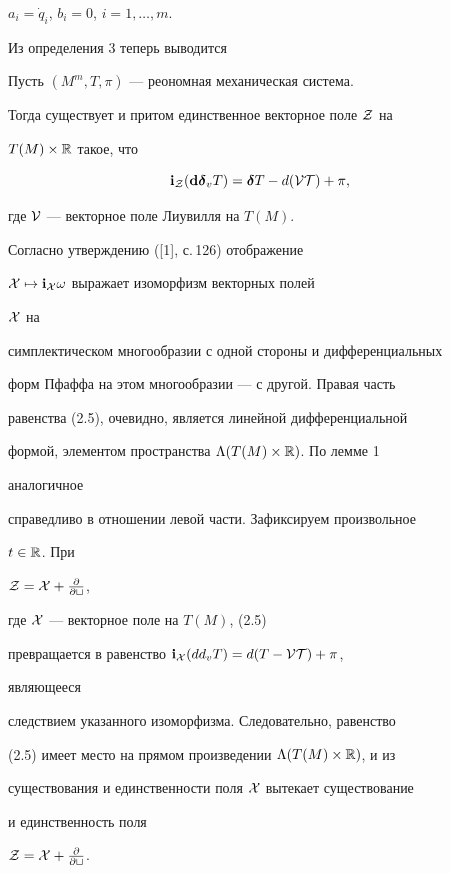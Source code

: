 $a_i=\Dot q_i$, $b_i=0$, $i=1,\dotsc,m$. 


 


Из определения 3 теперь выводится


 


\begin{lem} 


Пусть $(M^m,T,\pi)$ --- реономная механическая система. 


Тогда существует и притом единственное векторное поле $\cal Z$ на 


$T(M)\times\Bbb R$ такое, что 


\begin{equation} 


\bold i_{\cal Z}(\bold d\boldsymbol \delta_v T)=


\boldsymbol \delta T-d(\cal V T)+\pi, 


\end{equation} 


где $\cal V$ --- векторное поле Лиувилля на $T(M)$. 


\end{lem} 


 


\begin{pf} 


Согласно утверждению ([1], с.\,126) отображение 


$\cal X\mapsto \bold i_{\cal X}\omega$ выражает изоморфизм векторных полей 


$\cal X$ на 


симплектическом многообразии с одной стороны и дифференциальных 


форм Пфаффа на этом многообразии --- с другой. Правая часть 


равенства (2.5), очевидно, является линейной дифференциальной 


формой, элементом пространства $\Lambda(T(M)\times\Bbb R)$. По лемме 1 


аналогичное 


справедливо в отношении левой части. Зафиксируем произвольное 


$t\in\Bbb R$. При 


$\cal Z=\cal X+\frac{\partial}{\partial t}$, 


где $\cal X$ --- векторное поле на $T(M)$, (2.5) 


превращается в равенство $\bold i_{\cal X}(d d_v T)=d(T-\cal V T)+\pi$, 


являющееся 


следствием указанного изоморфизма. Следовательно, равенство 


(2.5) имеет место на прямом произведении $\Lambda(T(M)\times\Bbb R)$, и из 


существования и единственности поля $\cal X$ вытекает существование 


и единственность поля 


$\cal Z=\cal X+\frac{\partial}{\partial t}$.


\end{pf}


